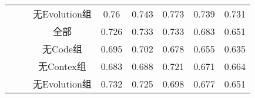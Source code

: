 \begin{table} [htbp]
\begin{tabular}{cccccccc}
&&无Evolution组& 0.76     & 0.743  & 0.773 & 0.739 & 0.731 \\
\cline{2-8}
&~\multirow{4}{*}{Tuxguitar} 
&全部         & 0.726    & 0.733  & 0.733 & 0.683 & 0.651 \\
&&无Code组   & 0.695    & 0.702  & 0.678 & 0.655 & 0.635 \\
&&无Contex组 & 0.683    & 0.688  & 0.721 & 0.671 & 0.664 \\
&&无Evolution组& 0.732    & 0.725  & 0.698 & 0.677 & 0.651\\
\bottomrule[1.5pt]
\end{tabular}
\end{table} 


